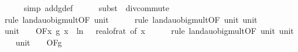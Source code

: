 \begin{isabellebody}
\ \ \ \ \isamarkupfalse%
\ {\isacharparenleft}{\kern0pt}simp\ add{\isacharcolon}{\kern0pt}g{}{\isacharunderscore}{\kern0pt}def{\isacharparenright}{\kern0pt}\isanewline
\ \ \ \ \isamarkupfalse%
\ {\isacharparenleft}{\kern0pt}subst\ {\isacharparenleft}{\kern0pt}{}{\isacharparenright}{\kern0pt}\ div{\isacharunderscore}{\kern0pt}commute{\isacharparenright}{\kern0pt}\isanewline
\ \ \ \ \isamarkupfalse%
\ {\isacharparenleft}{\kern0pt}rule\ landau{\isacharunderscore}{\kern0pt}o{\isachardot}{\kern0pt}big{\isacharunderscore}{\kern0pt}mult{\isacharunderscore}{\kern0pt}{}{\isacharbrackleft}{\kern0pt}OF\ unit{\isacharunderscore}{\kern0pt}{}{\isacharbrackright}{\kern0pt}{\isacharparenright}{\kern0pt}\isanewline
\ \ \ \ \isamarkupfalse%
\ {\isacharparenleft}{\kern0pt}rule\ landau{\isacharunderscore}{\kern0pt}o{\isachardot}{\kern0pt}big{\isacharunderscore}{\kern0pt}mult{\isacharunderscore}{\kern0pt}{}{\isacharbrackleft}{\kern0pt}OF\ unit{\isacharunderscore}{\kern0pt}{}\ unit{\isacharunderscore}{\kern0pt}{}{\isacharbrackright}{\kern0pt}{\isacharparenright}{\kern0pt}\isanewline
\isanewline
\ \ \isamarkupfalse%
\ unit{\isacharunderscore}{\kern0pt}{}{\isacharcolon}{\kern0pt}\ {\isachardoublequoteopen}{\isacharparenleft}{\kern0pt}{\isasymlambda}{\isacharunderscore}{\kern0pt}{\isachardot}{\kern0pt}\ {}{\isacharparenright}{\kern0pt}\ {\isasymin}\ O{\isacharbrackleft}{\kern0pt}{\isacharquery}{\kern0pt}F{\isacharbrackright}{\kern0pt}{\isacharparenleft}{\kern0pt}{\isasymlambda}x{\isachardot}{\kern0pt}\ g{}\ x\ {\isacharasterisk}{\kern0pt}\ ln\ {\isacharparenleft}{\kern0pt}{}\ {\isacharslash}{\kern0pt}\ real{\isacharunderscore}{\kern0pt}of{\isacharunderscore}{\kern0pt}rat\ {\isacharparenleft}{\kern0pt}{\isasymepsilon}{\isacharunderscore}{\kern0pt}of\ x{\isacharparenright}{\kern0pt}{\isacharparenright}{\kern0pt}{\isacharparenright}{\kern0pt}{\isachardoublequoteclose}\isanewline
\ \ \ \ \isamarkupfalse%
\ {\isacharparenleft}{\kern0pt}rule\ landau{\isacharunderscore}{\kern0pt}o{\isachardot}{\kern0pt}big{\isacharunderscore}{\kern0pt}mult{\isacharunderscore}{\kern0pt}{}{\isacharbrackleft}{\kern0pt}OF\ unit{\isacharunderscore}{\kern0pt}{}\ unit{\isacharunderscore}{\kern0pt}{}{\isacharbrackright}{\kern0pt}{\isacharparenright}{\kern0pt}\isanewline
\isanewline
\ \ \isamarkupfalse%
\ unit{\isacharunderscore}{\kern0pt}{}{\isacharcolon}{\kern0pt}\ {\isachardoublequoteopen}{\isacharparenleft}{\kern0pt}{\isasymlambda}{\isacharunderscore}{\kern0pt}{\isachardot}{\kern0pt}\ {}{\isacharparenright}{\kern0pt}\ {\isasymin}\ O{\isacharbrackleft}{\kern0pt}{\isacharquery}{\kern0pt}F{\isacharbrackright}{\kern0pt}{\isacharparenleft}{\kern0pt}g{\isacharparenright}{\kern0pt}{\isachardoublequoteclose}\isanewline

\end{isabellebody}
